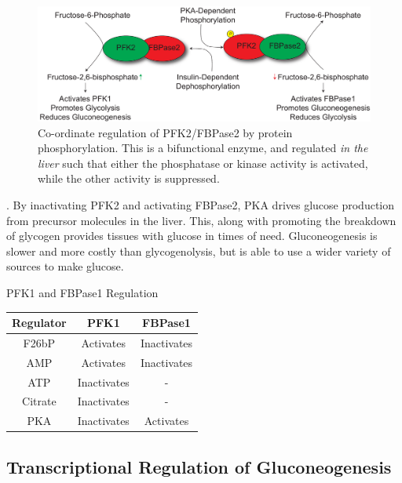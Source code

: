 \documentclass{tufte-handout}
\begin{document}
\begin{figure}
\includegraphics{figures/PFK2-FBPase2.pdf}
\caption{Co-ordinate regulation of PFK2/FBPase2 by protein phosphorylation.  This is a bifunctional enzyme, and regulated \emph{in the liver} such that either the phosphatase or kinase activity is activated, while the other activity is suppressed.}
\label{fig:gluconeogenic-substrates-lactate}
\end{figure}

.  By inactivating PFK2 and activating FBPase2, PKA drives glucose production from precursor molecules in the liver.  This, along with promoting the breakdown of glycogen provides tissues with glucose in times of need.  Gluconeogenesis is slower and more costly than glycogenolysis, but is able to use a wider variety of sources to make glucose.

\begin{margintable}
\centering
\caption{PFK1 and FBPase1 Regulation}
\label{tab:fbpase-pfk}
\begin{tabular}{ccc}
\hline
\textbf {Regulator} & \textbf{PFK1}  & \textbf{FBPase1} \\
\hline
F26bP & Activates & Inactivates\\
AMP & Activates & Inactivates \\
ATP & Inactivates & - \\
Citrate & Inactivates & - \\
PKA & Inactivates & Activates\\
\hline
\end{tabular}
\end{margintable}

\subsection{Transcriptional Regulation of Gluconeogenesis}
\end{document}
